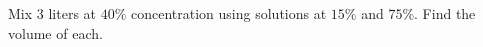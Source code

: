 Mix $3$ liters at $40\%$ concentration using solutions at $15\%$ and $75\%$. Find the volume of each.
